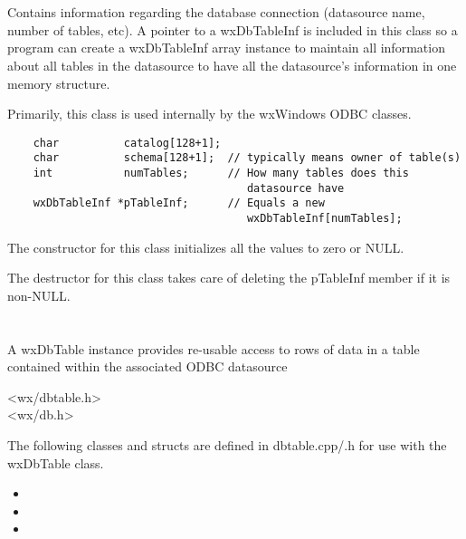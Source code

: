 \section{}\label{wxdbinf}

Contains information regarding the database connection (datasource name, 
number of tables, etc).  A pointer to a wxDbTableInf is included in this 
class so a program can create a wxDbTableInf array instance to maintain all
information about all tables in the datasource to have all the datasource's
information in one memory structure.

Primarily, this class is used internally by the wxWindows ODBC classes.

\begin{verbatim}
    char          catalog[128+1];
    char          schema[128+1];  // typically means owner of table(s)
    int           numTables;      // How many tables does this 
                                     datasource have
    wxDbTableInf *pTableInf;      // Equals a new 
                                     wxDbTableInf[numTables];
\end{verbatim}

The constructor for this class initializes all the values to zero or NULL.

The destructor for this class takes care of deleting the pTableInf member if 
it is non-NULL.


\section{}\label{wxdbtable}

A wxDbTable instance provides re-usable access to rows of data in
a table contained within the associated ODBC datasource


<wx/dbtable.h>\\
<wx/db.h>


The following classes and structs are defined in dbtable.cpp/.h for use with the wxDbTable class.

\begin{itemize}\itemsep=0pt
\item {}
\item {}
\item {}
\end{itemize}

